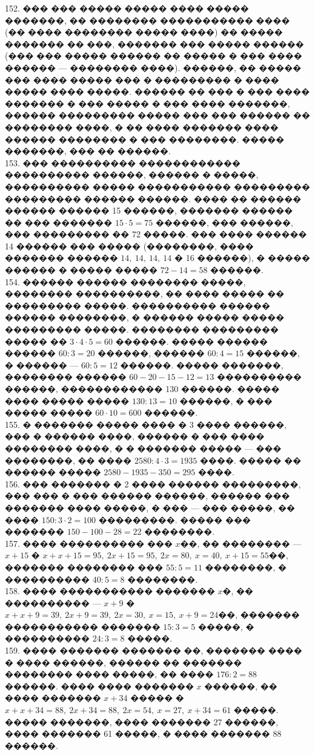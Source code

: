 \documentclass[12pt]{article}
\begin{document}
152. ��� ��� ����� ����� ���� ����� �������, �� �������� ����������� ���� (�� ���� �������� ����� ����) �� ����� ������� �� ���, ������� ��� ����� ������ (��� ��� ����� ������ �� ����� � ��� ���� ������ --- �������� ����). ������, �� ����� ��� ���� ����� ��� � ��������� � ���� ����� ���� �����. ������ �� ��� � ��� ���� ������� � ��� ����� � ��� ���� �������, ������ ��������� ����� ��� ��� ������ �� �������� ����, � �� ���� ������� ���� ������ �������� � ��� ��������. ����� �������, ��� �� ������.\\
153. ��� ���������� ������������ ���������� ������, ������ � �����, ���������� ����� ����������� ��������� ��������� ������ ������. ���� �� ������ ������ ������ 15 ������, ������� ������ �� ��� ������� $15\cdot5=75$ ������, ��� ������, ��� ��������� �� 72 �����. ��� ���� ������ 14 ������ ��� ����� (��������, ���� ������� ������ $14,\ 14,\ 14,\ 14$ � 16 ������), � ����� ������ � ����� ����� $72-14=58$ ������.\\
154. ������ ������ �������� �����, �������� ����������, �� ���� ����� �� ��������� �����. ���������� ������ ������ ��������, � ������ ����� ����� ��������� �����.
�������� ��������� ����� �� $3\cdot4\cdot5=60$ ������. ����� ������ ������ $60:3=20$ ������, ������ $60:4=15$ ������, � ������ --- $60:5=12$ ������. ����� �������, �������� ������ $60-20-15-12=13$ ���������� ������, ������������ 130 ������. ����� ���� ����� ����� $130:13=10$ ������, � ��� ����� ����� $60\cdot10=600$ ������.\\
155. � ������� ����� ���� � 3 ���� ������, ��� � ������ ����, ������ � ��� ���� �������� ����, � � ������� ����� --- ��� ��������, �� ���� $2580:4\cdot3=1935$ ����. ����� �� ������ ����� $2580-1935-350=295$ ����.\\
156. ��� ������� � 2 ���� ������ ���������, ��� ��� � ��� ������ ������, ������ ��� ������� ���� �����, � ��� --- ��� �����, �� ���� $150:3\cdot2=100$ ���������. ����� ��� ������� $150-100-28=22$ ��������.\\
157. ���� ���������� ��� $x$��, �� �������� --- $x+15$ � $x+x+15=95,\ 2x+15=95,\ 2x=80,\ x=40,\ x+15=55$��, ������� �������� ��� $55:5=11$ ��������, � ���������� $40:5=8$ ��������.\\
158. ���� ����������� ������� $x$�, �� ���������� --- $x+9$ � $x+x+9=39,\ 2x+9=39,\ 2x=30,\ x=15,\ x+9=24$��, ������� ����������� ������� $15:3=5$ �����, � ���������� $24:3=8$ �����.\\
159. ���� ������� ������� ��, ������� ���� � ���� ������, ������ �� ������� �������� ���� �����, �� ���� $176:2=88$ ������. ���� ���� ������� $x$ ������, �� ���� ������� $x+34$ ����� �  $x+x+34=88,\ 2x+34=88,\ 2x=54,\ x=27,\ x+34=61$ �����. ����� �������, ���� ������� 27 ������, ���� ������� 61 �����, � ���� ������� 88 ������.\\
\end{document}
